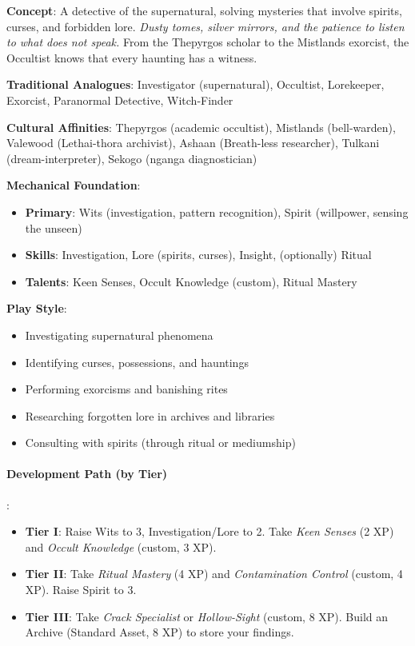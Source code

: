 \textbf{Concept}: A detective of the supernatural, solving mysteries that involve spirits, curses, and forbidden lore. \emph{Dusty tomes, silver mirrors, and the patience to listen to what does not speak.} From the Thepyrgos scholar to the Mistlands exorcist, the Occultist knows that every haunting has a witness.

\textbf{Traditional Analogues}: Investigator (supernatural), Occultist, Lorekeeper, Exorcist, Paranormal Detective, Witch-Finder

\textbf{Cultural Affinities}: Thepyrgos (academic occultist), Mistlands (bell-warden), Valewood (Lethai-thora archivist), Ashaan (Breath-less researcher), Tulkani (dream-interpreter), Sekogo (nganga diagnostician)

\textbf{Mechanical Foundation}:
\begin{itemize}
\item \textbf{Primary}: Wits (investigation, pattern recognition), Spirit (willpower, sensing the unseen)
\item \textbf{Skills}: Investigation, Lore (spirits, curses), Insight, (optionally) Ritual
\item \textbf{Talents}: Keen Senses, Occult Knowledge (custom), Ritual Mastery
\end{itemize}

\textbf{Play Style}:
\begin{itemize}
\item Investigating supernatural phenomena
\item Identifying curses, possessions, and hauntings
\item Performing exorcisms and banishing rites
\item Researching forgotten lore in archives and libraries
\item Consulting with spirits (through ritual or mediumship)
\end{itemize}

\paragraph{Development Path (by Tier)}:
\begin{itemize}
\item \textbf{Tier I}: Raise Wits to 3, Investigation/Lore to 2. Take \emph{Keen Senses} (2 XP) and \emph{Occult Knowledge} (custom, 3 XP).
\item \textbf{Tier II}: Take \emph{Ritual Mastery} (4 XP) and \emph{Contamination Control} (custom, 4 XP). Raise Spirit to 3.
\item \textbf{Tier III}: Take \emph{Crack Specialist} or \emph{Hollow-Sight} (custom, 8 XP). Build an Archive (Standard Asset, 8 XP) to store your findings.
\end{itemize}

